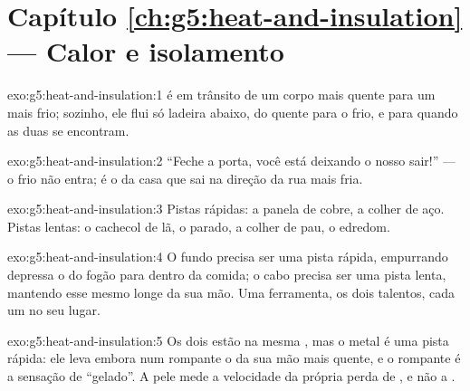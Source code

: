 \section*{Capítulo \ref{ch:g5:heat-and-insulation} --- Calor e isolamento}

\begin{solution}{exo:g5:heat-and-insulation:1}
 é  em trânsito de um corpo mais quente para um mais
frio; sozinho, ele flui só ladeira abaixo, do quente para o frio, e
para quando as duas  se encontram.
\end{solution}

\begin{solution}{exo:g5:heat-and-insulation:2}
``Feche a porta, você está deixando o nosso  sair!'' --- o frio
não entra; é o  da casa que sai na direção da rua mais fria.
\end{solution}

\begin{solution}{exo:g5:heat-and-insulation:3}
Pistas rápidas: a panela de cobre, a colher de aço. Pistas lentas: o
cachecol de lã, o  parado, a colher de pau, o edredom.
\end{solution}

\begin{solution}{exo:g5:heat-and-insulation:4}
O fundo precisa ser uma pista rápida, empurrando depressa o  do
fogão para dentro da comida; o cabo precisa ser uma pista lenta,
mantendo esse mesmo  longe da sua mão. Uma ferramenta, os dois
talentos, cada um no seu lugar.
\end{solution}

\begin{solution}{exo:g5:heat-and-insulation:5}
Os dois estão na mesma , mas o metal é uma pista rápida:
ele leva embora num rompante o  da sua mão mais quente, e o
rompante é a sensação de ``gelado''. A pele mede a velocidade da
própria perda de , e não a .
\end{solution}

